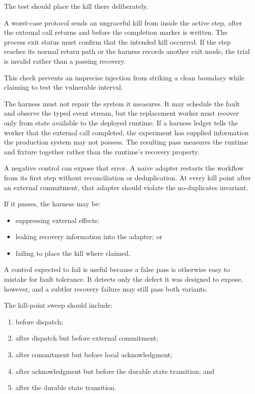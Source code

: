 The test should place the kill there deliberately.

A worst-case protocol sends an ungraceful kill from inside the active step, after the external call returns and before the completion marker is written. The process exit status must confirm that the intended kill occurred. If the step reaches its normal return path or the harness records another exit mode, the trial is invalid rather than a passing recovery.

This check prevents an imprecise injection from striking a clean boundary while claiming to test the vulnerable interval.

The harness must not repair the system it measures. It may schedule the fault and observe the typed event stream, but the replacement worker must recover only from state available to the deployed runtime. If a harness ledger tells the worker that the external call completed, the experiment has supplied information the production system may not possess. The resulting pass measures the runtime and fixture together rather than the runtime's recovery property.

A negative control can expose that error. A naive adapter restarts the workflow from its first step without reconciliation or deduplication. At every kill point after an external commitment, that adapter should violate the no-duplicates invariant.

If it passes, the harness may be:

\begin{itemize}
\tightlist
\item
  suppressing external effects;
\item
  leaking recovery information into the adapter; or
\item
  failing to place the kill where claimed.
\end{itemize}

A control expected to fail is useful because a false pass is otherwise easy to mistake for fault tolerance. It detects only the defect it was designed to expose, however, and a subtler recovery failure may still pass both variants.

The kill-point sweep should include:

\begin{enumerate}
\def\labelenumi{\arabic{enumi}.}
\tightlist
\item
  before dispatch;
\item
  after dispatch but before external commitment;
\item
  after commitment but before local acknowledgment;
\item
  after acknowledgment but before the durable state transition; and
\item
  after the durable state transition.
\end{enumerate}

